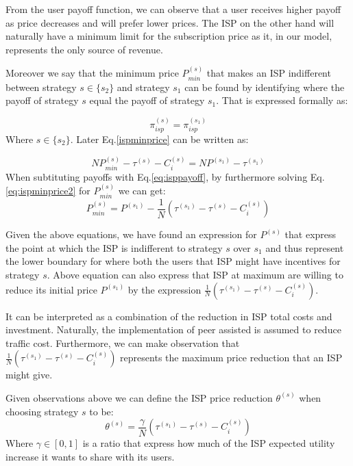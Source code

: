 \documentclass[paper]{ieice}
\begin{document}
From the user payoff function, we can observe that a user receives higher payoff as price decreases and will prefer lower prices.
The ISP on the other hand will naturally have a minimum limit for the subscription price as it, in our model, represents the only source of revenue.

Moreover we say that the minimum price $P^{(s)}_{min}$ that makes an ISP indifferent between strategy $s \in \{s_2\}$ and strategy $s_1$ can be found by identifying where the payoff of strategy $s$ equal the payoff of strategy $s_1$. 
That is expressed formally as:

\begin{equation}\label{ispminprice}
	\pi^{(s)}_{isp} = \pi^{(s_1)}_{isp}
\end{equation}
Where $s \in \{s_2\}$. 
Later Eq.\ref{ispminprice} can be written as: 

\begin{equation}\label{eq:ispminprice2}
	N P^{(s)}_{min} - \tau^{(s)} - C^{(s)}_i = N P^{(s_1)} - \tau^{(s_1)}  
\end{equation}
When subtituting payoffs with Eq.\ref{eq:isppayoff}, by furthermore solving Eq.\ref{eq:ispminprice2} for $P^{(s)}_{min}$ we can get:
\begin{equation}\label{eq:ispminprice3}
	P^{(s)}_{min} = P^{(s_1)} - \frac{1}{N} ( \tau^{(s_1)} - \tau^{(s)} -  C^{(s)}_i  )
\end{equation}

Given the above equations, we have found an expression for $P^{(s)}$ that express the point at which the ISP is indifferent to strategy $s$ over $s_1$ and thus represent the lower boundary for where both the users that ISP might have incentives for strategy $s$. 
Above equation can also express that ISP at maximum are willing to reduce its initial price $P^{(s_1)}$ by the expression $\frac{1}{N} ( \tau^{(s_1)} - \tau^{(s)} -  C^{(s)}_i  )$.

It can be interpreted as a combination of the reduction in ISP total costs and investment.
Naturally, the implementation of peer assisted is assumed to reduce traffic cost.  
Furthermore, we can make observation that $\frac{1}{N} ( \tau^{(s_1)} - \tau^{(s)} -  C^{(s)}_i )$ represents the maximum price reduction that an ISP might give. 

\newtheorem{theorem8}{Definition}
\begin{theorem}
Given observations above we can define the ISP price reduction $\theta^{(s)}$ when choosing strategy $s$ to be:
\begin{equation}
 \theta^{(s)} = \frac{\gamma}{N} ( \tau^{(s_1)} - \tau^{(s)} -  C^{(s)}_i  )
\end{equation}
Where $\gamma \in [0,1]$ is a ratio that express how much of the ISP expected utility increase it wants to share with its users.   
\end{theorem}
\end{document}
